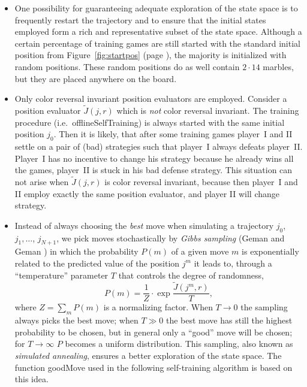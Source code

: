 \begin{itemize}
\item 
One possibility for guaranteeing adequate exploration of the state space is to frequently restart the trajectory and to ensure that the initial states employed form a rich and representative subset of the state space. Although a certain percentage of training games are still started with the standard initial position from Figure~\ref{fig:startpos} (page \pageref{fig:startpos}), the majority is initialized with random positions. These random positions do as well contain $2 \cdot 14$ marbles, but they are placed anywhere on the board.

\item Only color reversal invariant position evaluators are employed. Consider a position evaluator $\tilde J(j,r)$ which is \emph{not} color reversal invariant. The training procedure (i.e.~{\al offline\-Self\-Training)} is always started with the same initial position $j_0$. Then it is likely, that after some training games player~I and II settle on a pair of (bad) strategies such that player~I always defeats player~II. Player~I has no incentive to change his strategy because he already wins all the games, player~II is stuck in his bad defense strategy. This situation can not arise when $\tilde J(j,r)$ is color reversal invariant, because then player~I and II employ exactly the same position evaluator, and player II will change strategy.

\item Instead of always choosing the \emph{best} move when simulating a trajectory $j_0$, $j_1, \ldots$, $j_{N+1}$, we pick moves stochastically by \emph{Gibbs sampling} (Geman and Geman \cite{Geman84}) in which the probability $P(m)$ of a given move $m$ is exponentially related to the predicted value of the position $j^m$ it leads to, through a ``temperature'' parameter $T$ that controls the degree of randomness,
\begin{equation} \label{eq:gibbs}
P(m) = \frac{1}{Z} \cdot \exp\frac{\tilde J(j^m,r)}{T},
\end{equation}
where $Z = \sum_m P(m)$ is a normalizing factor. When $T \rightarrow 0$ the sampling always picks the best move; when $T \gg 0$ the best move has still the highest probability to be chosen, but in general only a ``good'' move will be chosen; for $T\rightarrow\infty$ $P$ becomes a uniform distribution. This sampling, also known as \emph{simulated annealing}, ensures a better exploration of the state space. The function {\al goodMove} used in the following self-training algorithm is based on this idea.
\end{itemize}

